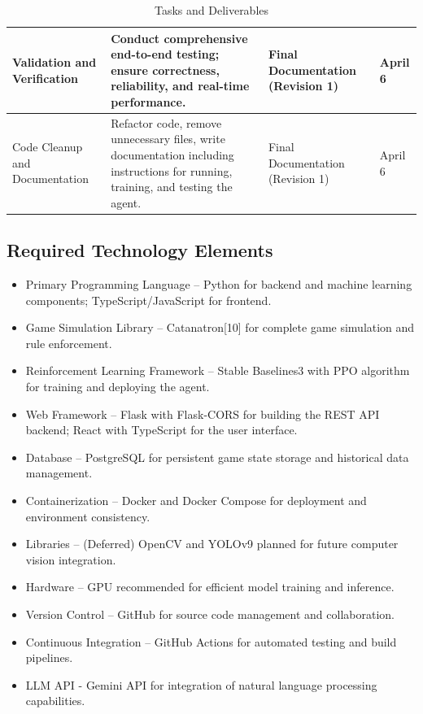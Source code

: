 \documentclass{article}
\begin{document}
\begin{table}[htbp]
\begin{tabular}{|p{3cm}|p{5cm}|p{3cm}|p{2cm}|}
Validation and Verification & Conduct comprehensive end-to-end testing; ensure correctness, reliability, and real-time performance. & Final Documentation (Revision 1) & April 6 \\ \hline

Code Cleanup and Documentation & Refactor code, remove unnecessary files, write documentation including instructions for running, training, and testing the agent. & Final Documentation (Revision 1) & April 6 \\ \hline

\end{tabular}
\caption{Tasks and Deliverables}
\label{tab:tasks-deliverables}
\end{table}

\FloatBarrier


\subsection{Required Technology Elements}\label{subsec:requiredtech}
\begin{itemize}
    \item {Primary Programming Language} – Python for backend and machine learning components; TypeScript/JavaScript for frontend.
    \item {Game Simulation Library} – Catanatron[10] for complete \emph{\Catan{}} game simulation and rule enforcement.
    \item {Reinforcement Learning Framework} – Stable Baselines3 with PPO algorithm for training and deploying the \AI{} agent.
    \item {Web Framework} – Flask with Flask-CORS for building the REST API backend; React with TypeScript for the user interface.
    \item {Database} – PostgreSQL for persistent game state storage and historical data management.
    \item {Containerization} – Docker and Docker Compose for deployment and environment consistency.
    \item {\CV{} Libraries} – (Deferred) OpenCV and YOLOv9 planned for future computer vision integration.
    \item {Hardware} – GPU recommended for efficient \RL{} model training and inference.
    \item {Version Control} – GitHub for source code management and collaboration.
    \item {Continuous Integration} – GitHub Actions for automated testing and build pipelines.
    \item {LLM API} - Gemini API for integration of natural language processing capabilities.
\end{itemize}
\end{document}

